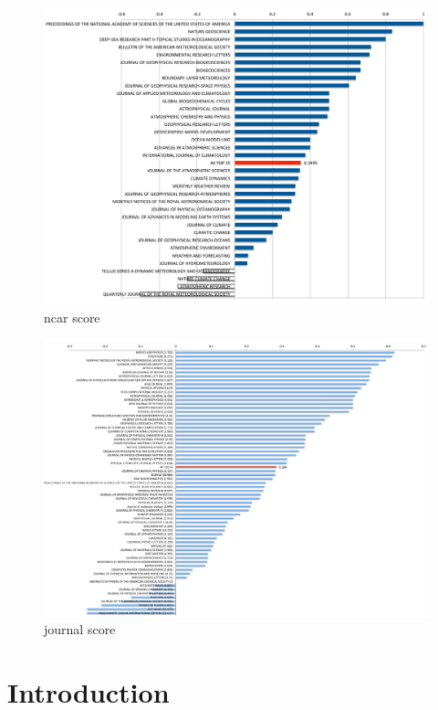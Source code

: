 \documentclass{sig-alternate}
\begin{document}
\begin{figure}[htb] 
  \centering 
    \includegraphics[width=1.0\textwidth]{images-new/ncar-journal-bar-by-score.pdf} 
  \caption{ncar score}\label{F:ncar-score} 
\end{figure} 

\begin{figure}[htb] 
  \centering 
    \includegraphics[width=1.0\textwidth]{images-new/journals_bar_by_score.pdf} 
  \caption{journal score}\label{F:jounarl-score} 
\end{figure} 


\section{Introduction} 
\end{document}
